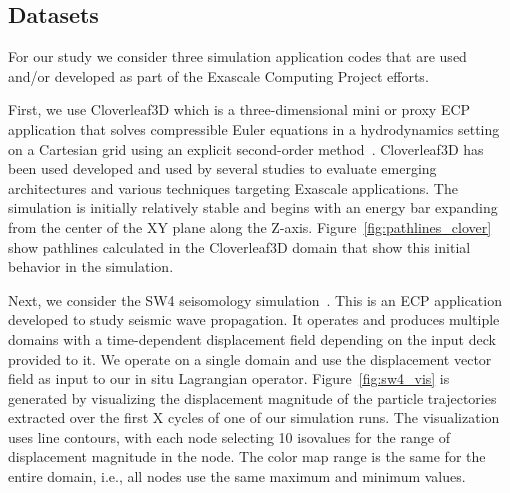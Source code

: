 %
%
%
%
%
%

%
%
%

\subsection{Datasets}
\label{sec:datasets}
For our study we consider three simulation application codes that are used and/or developed as part of the Exascale Computing Project efforts.
%

First, we use Cloverleaf3D which is a three-dimensional mini or proxy ECP application that solves compressible Euler equations in a hydrodynamics setting on a Cartesian grid using an explicit second-order method~\cite{cloverleaf3d}. 
%
Cloverleaf3D has been used developed and used by several studies to evaluate emerging architectures and various techniques targeting Exascale applications.
%
The simulation is initially relatively stable and begins with an energy bar expanding from the center of the XY plane along the Z-axis. 
%
Figure~\ref{fig:pathlines_clover} show pathlines calculated in the Cloverleaf3D domain that show this initial behavior in the simulation.

Next, we consider the SW4 seisomology simulation~\cite{petersson2015wave}.
%
This is an ECP application developed to study seismic wave propagation.
%
It operates and produces multiple domains with a time-dependent displacement field depending on the input deck provided to it.
%
We operate on a single domain and use the displacement vector field as input to our in situ Lagrangian operator.
%
Figure~\ref{fig:sw4_vis} is generated by visualizing the displacement magnitude of the particle trajectories extracted over the first X cycles of one of our simulation runs. 
%
The visualization uses line contours, with each node selecting 10 isovalues for the range of displacement magnitude in the node.
%
The color map range is the same for the entire domain, i.e., all nodes use the same maximum and minimum values.
%

